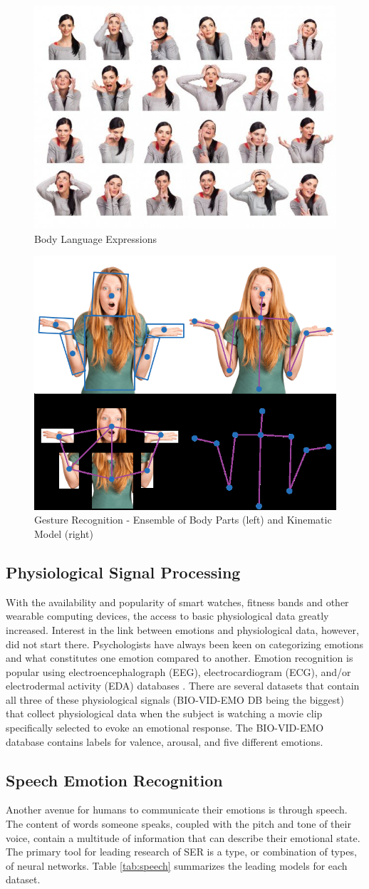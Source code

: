     \begin{figure}[!htb]
    \centering
    \includegraphics[width=.3\textwidth]{figures/bodylanguage.png}
    \caption{\label{fig:body} Body Language Expressions \cite{noroozi-2021}}
    \end{figure} 
    
    \begin{figure}[!htb]
    \centering
    \includegraphics[width=.3\textwidth]{figures/gesture_recognition.jpg}
    \caption{\label{fig:gesture-recognition} Gesture Recognition - Ensemble of Body Parts (left) and Kinematic Model (right) \cite{noroozi-2021}}
    \end{figure} 


\subsection{Physiological Signal Processing}
    With the availability and popularity of smart watches, fitness bands and other wearable computing devices, the access to basic physiological data greatly increased. Interest in the link between emotions and physiological data, however, did not start there. Psychologists have always been keen on categorizing emotions and what constitutes one emotion compared to another. Emotion recognition is popular using electroencephalograph (EEG), electrocardiogram (ECG), and/or electrodermal activity (EDA) databases \cite{xiao-2022}. There are several datasets that contain all three of these physiological signals (BIO-VID-EMO DB being the biggest) that collect physiological data when the subject is watching a movie clip specifically selected to evoke an emotional response. The BIO-VID-EMO database \cite{zhang_biovid_2016} contains labels for valence, arousal, and five different emotions. 


\subsection{Speech Emotion Recognition}
    Another avenue for humans to communicate their emotions is through speech. The content of words someone speaks, coupled with the pitch and tone of their voice, contain a multitude of information that can describe their emotional state. The primary tool for leading research of SER is a type, or combination of types, of neural networks. Table \ref{tab:speech} summarizes the leading models for each dataset.

